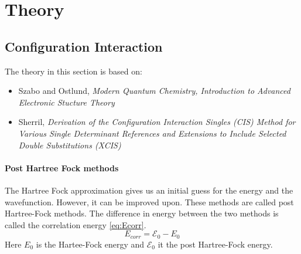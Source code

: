\section{Theory}

\subsection{Configuration Interaction}

The theory in this section is based on:
\begin{itemize}
    \item Szabo and Ostlund, \textit{Modern Quantum Chemistry, Introduction to Advanced Electronic Stucture Theory}
    \item Sherril, \textit{Derivation of the Configuration Interaction Singles (CIS) Method for Various Single Determinant References and Extensions to Include Selected Double Substitutions (XCIS)}
\end{itemize}

\paragraph{Post Hartree Fock methods}
The Hartree Fock approximation gives us an initial guess for the energy and the wavefunction. However, it can be improved upon. These methods are called post Hartree-Fock methods. The difference in energy between the two methods is called the correlation energy \eqref{eq:Ecorr}.
\begin{equation}\label{eq:Ecorr}
    E_{corr} = \mathcal{E}_0 - E_0
\end{equation}
Here $E_0$ is the Hartee-Fock energy and $\mathcal{E}_0$ it the post Hartree-Fock energy.


